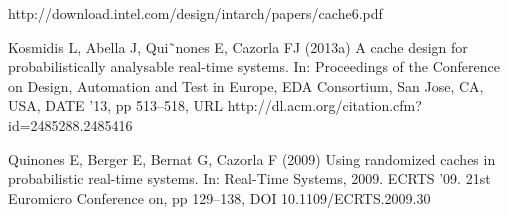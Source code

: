 \documentclass[conference]{IEEEtran}
\begin{document}


%
%
%
\begin{thebibliography}{1}

http://download.intel.com/design/intarch/papers/cache6.pdf

Kosmidis L, Abella J, Qui˜nones E, Cazorla FJ (2013a) A cache design for probabilistically
analysable real-time systems. In: Proceedings of the Conference on Design, Automation
and Test in Europe, EDA Consortium, San Jose, CA, USA, DATE ’13, pp 513–518, URL
http://dl.acm.org/citation.cfm?id=2485288.2485416

Quinones E, Berger E, Bernat G, Cazorla F (2009) Using randomized caches in probabilistic
real-time systems. In: Real-Time Systems, 2009. ECRTS ’09. 21st Euromicro Conference
on, pp 129–138, DOI 10.1109/ECRTS.2009.30

\end{thebibliography}




\end{document}
